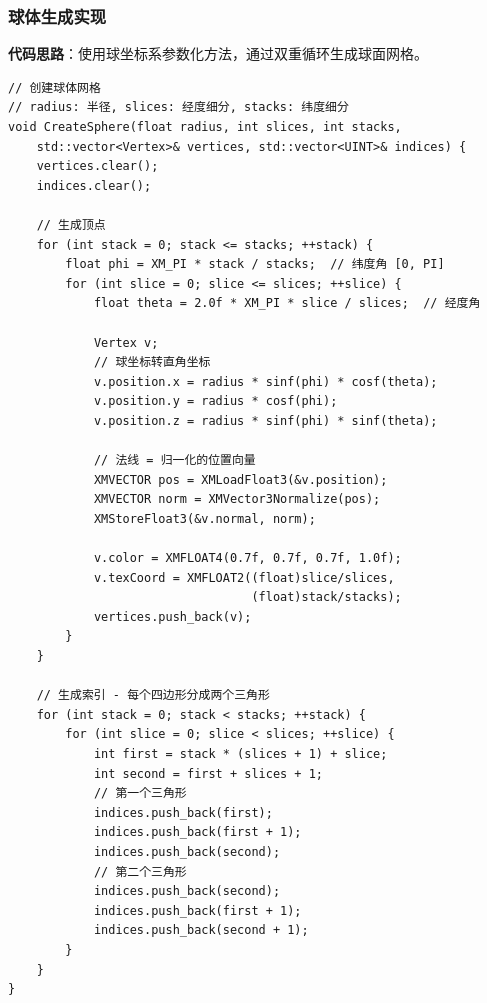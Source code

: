 \documentclass[12pt,a4paper]{article}
\begin{document}
\begin{tcolorbox}
\subsubsection{球体生成实现}

\textbf{代码思路}：使用球坐标系参数化方法，通过双重循环生成球面网格。

\begin{lstlisting}[caption={球体生成函数}]
// 创建球体网格
// radius: 半径, slices: 经度细分, stacks: 纬度细分
void CreateSphere(float radius, int slices, int stacks,
    std::vector<Vertex>& vertices, std::vector<UINT>& indices) {
    vertices.clear();
    indices.clear();
    
    // 生成顶点
    for (int stack = 0; stack <= stacks; ++stack) {
        float phi = XM_PI * stack / stacks;  // 纬度角 [0, PI]
        for (int slice = 0; slice <= slices; ++slice) {
            float theta = 2.0f * XM_PI * slice / slices;  // 经度角
            
            Vertex v;
            // 球坐标转直角坐标
            v.position.x = radius * sinf(phi) * cosf(theta);
            v.position.y = radius * cosf(phi);
            v.position.z = radius * sinf(phi) * sinf(theta);
            
            // 法线 = 归一化的位置向量
            XMVECTOR pos = XMLoadFloat3(&v.position);
            XMVECTOR norm = XMVector3Normalize(pos);
            XMStoreFloat3(&v.normal, norm);
            
            v.color = XMFLOAT4(0.7f, 0.7f, 0.7f, 1.0f);
            v.texCoord = XMFLOAT2((float)slice/slices, 
                                  (float)stack/stacks);
            vertices.push_back(v);
        }
    }
    
    // 生成索引 - 每个四边形分成两个三角形
    for (int stack = 0; stack < stacks; ++stack) {
        for (int slice = 0; slice < slices; ++slice) {
            int first = stack * (slices + 1) + slice;
            int second = first + slices + 1;
            // 第一个三角形
            indices.push_back(first);
            indices.push_back(first + 1);
            indices.push_back(second);
            // 第二个三角形
            indices.push_back(second);
            indices.push_back(first + 1);
            indices.push_back(second + 1);
        }
    }
}
\end{lstlisting}
\end{tcolorbox}
\end{document}
